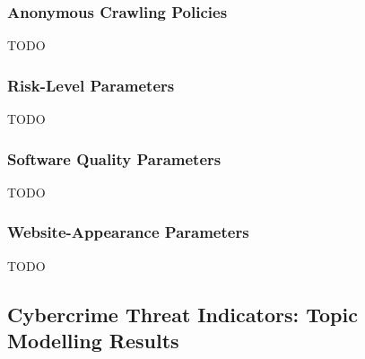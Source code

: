 \subsubsection{Anonymous Crawling Policies}

TODO\\

\subsubsection{Risk-Level Parameters}

TODO\\

\subsubsection{Software Quality Parameters}

TODO\\

\subsubsection{Website-Appearance Parameters}

TODO\\

\subsection{Cybercrime Threat Indicators: Topic Modelling Results}

